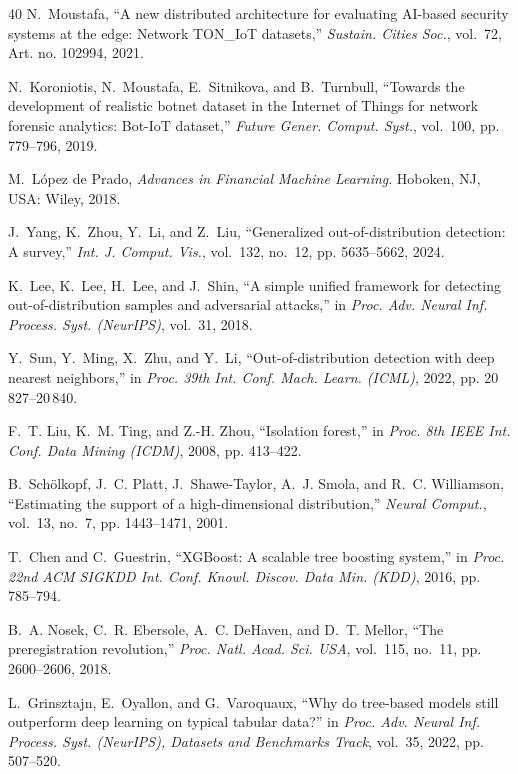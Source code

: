\begin{thebibliography}{40}
N.~Moustafa, ``A new distributed architecture for evaluating AI-based security systems at the edge: Network TON\_IoT datasets,'' \emph{Sustain. Cities Soc.}, vol.~72, Art. no. 102994, 2021.

N.~Koroniotis, N.~Moustafa, E.~Sitnikova, and B.~Turnbull, ``Towards the development of realistic botnet dataset in the Internet of Things for network forensic analytics: Bot-IoT dataset,'' \emph{Future Gener. Comput. Syst.}, vol.~100, pp. 779--796, 2019.

M.~L\'{o}pez de Prado, \emph{Advances in Financial Machine Learning}. Hoboken, NJ, USA: Wiley, 2018.

J.~Yang, K.~Zhou, Y.~Li, and Z.~Liu, ``Generalized out-of-distribution detection: A survey,'' \emph{Int. J. Comput. Vis.}, vol.~132, no.~12, pp. 5635--5662, 2024.

K.~Lee, K.~Lee, H.~Lee, and J.~Shin, ``A simple unified framework for detecting out-of-distribution samples and adversarial attacks,'' in \emph{Proc. Adv. Neural Inf. Process. Syst. (NeurIPS)}, vol.~31, 2018.

Y.~Sun, Y.~Ming, X.~Zhu, and Y.~Li, ``Out-of-distribution detection with deep nearest neighbors,'' in \emph{Proc. 39th Int. Conf. Mach. Learn. (ICML)}, 2022, pp. 20\,827--20\,840.

F.~T. Liu, K.~M. Ting, and Z.-H. Zhou, ``Isolation forest,'' in \emph{Proc. 8th IEEE Int. Conf. Data Mining (ICDM)}, 2008, pp. 413--422.

B.~Sch\"{o}lkopf, J.~C. Platt, J.~Shawe-Taylor, A.~J. Smola, and R.~C. Williamson, ``Estimating the support of a high-dimensional distribution,'' \emph{Neural Comput.}, vol.~13, no.~7, pp. 1443--1471, 2001.

T.~Chen and C.~Guestrin, ``XGBoost: A scalable tree boosting system,'' in \emph{Proc. 22nd ACM SIGKDD Int. Conf. Knowl. Discov. Data Min. (KDD)}, 2016, pp. 785--794.

B.~A. Nosek, C.~R. Ebersole, A.~C. DeHaven, and D.~T. Mellor, ``The preregistration revolution,'' \emph{Proc. Natl. Acad. Sci. USA}, vol.~115, no.~11, pp. 2600--2606, 2018.

L.~Grinsztajn, E.~Oyallon, and G.~Varoquaux, ``Why do tree-based models still outperform deep learning on typical tabular data?'' in \emph{Proc. Adv. Neural Inf. Process. Syst. (NeurIPS), Datasets and Benchmarks Track}, vol.~35, 2022, pp. 507--520.


\end{thebibliography}
